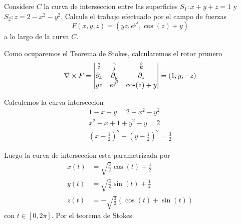 \documentclass[../main.tex]{subfiles}
\begin{document}
\begin{problem}
  Considere $C$ la curva de interseccion entre las superficies $S_{1}: x + y + z = 1$ y $S_{2} : z = 2 - x^{2} - y^{2}$. Calcule el trabajo efectuado por el campo de fuerzas
  \begin{equation*}
    F(x, y, z) = (yz, e^{y^{3}}, \cos(z) + y)
  \end{equation*}
  a lo largo de la curva $C$.
\end{problem}
\begin{solution}
  Como ocuparemos el Teorema de Stokes, calcularemos el rotor primero
  \begin{equation*}
    \nabla \times F = \begin{vmatrix} \hat{i} & \hat{j} & \hat{k}\\ \partial_x & \partial_y & \partial_z\\ yz & e^{y^{3}} & \cos(z) + y\end{vmatrix} = (1, y, -z)
  \end{equation*}

  Calculemos la curva interseccion
  \begin{gather*}
    1 - x - y = 2 - x^{2} - y^{2}\\
    x^{2} - x + 1 + y^{2} - y = 2\\
    (x - \frac{1}{2})^{2} + (y - \frac{1}{2})^{2} = \frac{3}{2}
  \end{gather*}

  Luego la curva de interseccion esta parametrizada por
  \begin{align*}
    x(t) &= \sqrt{\frac{3}{2}} \cos(t) + \frac{1}{2}\\
    y(t) &= \sqrt{\frac{3}{2}} \sin(t) + \frac{1}{2}\\
    z(t) &= - \sqrt{\frac{3}{2}}(\cos(t) + \sin(t))
  \end{align*}
  con $t \in [0, 2\pi]$. Por el teorema de Stokes
\end{solution}
\end{document}
